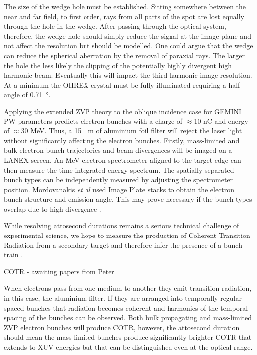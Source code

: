 The size of the wedge hole must be established. Sitting somewhere between the near and far field, to first order, rays from all parts of the spot are lost equally through the hole in the wedge. After passing through the optical system, therefore, the wedge hole should simply reduce the signal at the image plane and not affect the resolution but should be modelled. One could argue that the wedge can reduce the spherical aberration by the removal of paraxial rays. The larger the hole the less likely the clipping of the potentially highly divergent high harmonic beam. Eventually this will impact the third harmonic image resolution. At a minimum the OHREX crystal must be fully illuminated requiring a half angle of \qty{0.71}{\degree}.

Applying the extended ZVP theory to the oblique incidence case for GEMINI PW parameters predicts electron bunches with a charge of $\approx$10 nC and energy of $\approx$30 MeV. Thus, a \qty{15}{\mu m} of aluminium foil filter will reject the laser light without significantly affecting the electron bunches.
Firstly, mass-limited and bulk electron bunch trajectories and beam divergences will be imaged on a LANEX screen. An MeV electron spectrometer aligned to the target edge can then measure the time-integrated energy spectrum. The spatially separated bunch types can be independently measured by adjusting the spectrometer position. Mordovanakis \textit{et al} used Image Plate stacks to obtain the electron bunch structure and emission angle. This may prove necessary if the bunch types overlap due to high divergence \cite{mordovanakisQuasimonoenergeticElectronBeams2009}. 

While resolving attosecond durations remains a serious technical challenge of experimental science, we hope to measure the production of Coherent Transition Radiation from a secondary target and therefore infer the presence of a bunch train \cite{linIsolatedAttosecondElectron2020}. 


COTR - awaiting papers from Peter

When electrons pass from one medium to another they emit transition radiation, in this case, the aluminium filter. If they are arranged into temporally regular spaced bunches that radiation becomes coherent and harmonics of the temporal spacing of the bunches can be observed. Both bulk propagating and mass-limited ZVP electron bunches will produce COTR, however, the attosecond duration should mean the mass-limited bunches produce significantly brighter COTR that extends to XUV energies but that can be distinguished even at the optical range.


